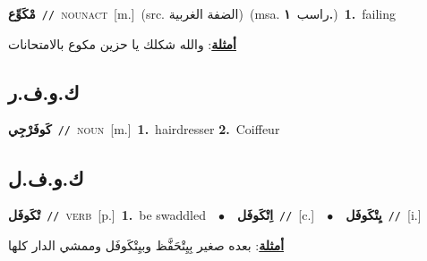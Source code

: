 \documentclass[10pt,a4paper,twoside]{article} %
\begin{document}
\begin{multicols}{2}
{\setlength\topsep{0pt}\textbf{\foreignlanguage{arabic}{مْكَوِّع}}\ {\color{gray}\texttt{//}\color{black}}\ \textsc{noun\textunderscore act}\ [m.]\ (src. \color{gray}\foreignlanguage{arabic}{الضفة الغربية}\color{black})\ \color{gray}(msa. \foreignlanguage{arabic}{راسب}~\foreignlanguage{arabic}{\textbf{١.}})\color{black}\ \textbf{1.}~failing\  \begin{flushright}\color{gray}\foreignlanguage{arabic}{\textbf{\underline{\foreignlanguage{arabic}{أمثلة}}}: والله شكلك يا حزين مكوع بالامتحانات}\end{flushright}\color{black}} \vspace{2mm}

\vspace{-3mm}
\subsection*{\color{blue}\foreignlanguage{arabic}{ك.و.ف.ر}\color{blue}{}} 

{\setlength\topsep{0pt}\textbf{\foreignlanguage{arabic}{كَوفَرْجِي}}\ {\color{gray}\texttt{//}\color{black}}\ \textsc{noun}\ [m.]\ \textbf{1.}~hairdresser  \textbf{2.}~Coiffeur\ } \vspace{2mm}

\vspace{-3mm}
\subsection*{\color{blue}\foreignlanguage{arabic}{ك.و.ف.ل}\color{blue}{}} 

{\setlength\topsep{0pt}\textbf{\foreignlanguage{arabic}{تْكَوفَل}}\ {\color{gray}\texttt{//}\color{black}}\ \textsc{verb}\ [p.]\ \textbf{1.}~be swaddled\ \ $\bullet$\ \ \setlength\topsep{0pt}\textbf{\foreignlanguage{arabic}{اِتْكَوفَل}}\ {\color{gray}\texttt{//}\color{black}}\ [c.]\ \ $\bullet$\ \ \setlength\topsep{0pt}\textbf{\foreignlanguage{arabic}{يِتْكَوفَل}}\ {\color{gray}\texttt{//}\color{black}}\ [i.]\  \begin{flushright}\color{gray}\foreignlanguage{arabic}{\textbf{\underline{\foreignlanguage{arabic}{أمثلة}}}: بعده صغير بِيِتْحَفَّظ وبيِتْكَوفَل وممشي الدار كلها}\end{flushright}\color{black}} \vspace{2mm}


\end{multicols}
\end{document}
